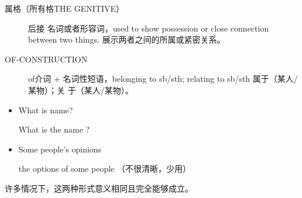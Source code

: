\begin{description}
\item[属格（所有格THE GENITIVE）]  后接
  名词或者形容词，used to show possession or close connection between two
  things. 展示两者之间的所属或紧密关系。
\item[OF-CONSTRUCTION] of介词 + 名词性短语，belonging to sb/sth; relating to sb/sth 属于（某人/某物）；关
  于（某人/某物）。
\end{description}

\begin{itemize}
\item What is  name?

  What is the name ?

\item Some people's opinions

  the options of some people （不很清晰，少用）
\end{itemize}
许多情况下，这两种形式意义相同且完全能够成立。

